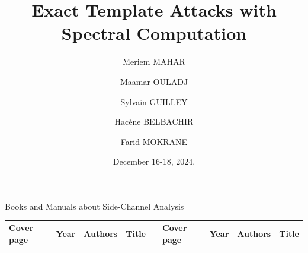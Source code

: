 \documentclass{beamer}
\title[AsianHOST 2024]{
\textbf{Exact Template Attacks with Spectral Computation}
}
\author[M. Mahar, M. Ouladj, S. Guilley, et al.]{
Meriem MAHAR %
\and 
Maamar OULADJ  
\and %
\underline{Sylvain GUILLEY} \\%
\and 
Hacène BELBACHIR %
\and 
Farid MOKRANE %
}
\institute[]{
Université Paris 8, LAGA, UMR 7539, Paris, France. 
\and
CERIST, Algiers, Algeria.
\and
	Secure-IC S.A.S.,
 Rennes, France, \\ \textit{and}
	\'Ecole Normale Sup\'erieure (ENS), 
 Paris, France. 
\and
CATI, RECITS Laboratory, 
USTHB, Algiers, Algeria. %
}
\date{December 16-18, 2024.}
\newcommand{\GGC}{\cellcolor[gray]{.82}} %
\begin{document}
\maketitle 



\begin{frame}{Books and Manuals about Side-Channel Analysis}
\begin{center}
\scriptsize
\setlength{\extrarowheight}{2pt}
\begin{tabular}{|m{15mm}|>{\!}c<{\!}|>{\!}m{9mm}<{\!}|m{14mm}|>{\!\!\!}c<{\!\!\!}
                |m{15mm}|>{\!}c<{\!}|>{\!}m{9mm}<{\!}|m{14mm}|}
\cline{1-4}\cline{6-9}
\GGC\bf Cover page & \GGC\bf Year & \GGC\bf Authors & \GGC\bf Title & &
\GGC\bf Cover page & \GGC\bf Year & \GGC\bf Authors & \GGC\bf Title \\

\end{tabular}
\end{center}
\end{frame}
\end{document}
